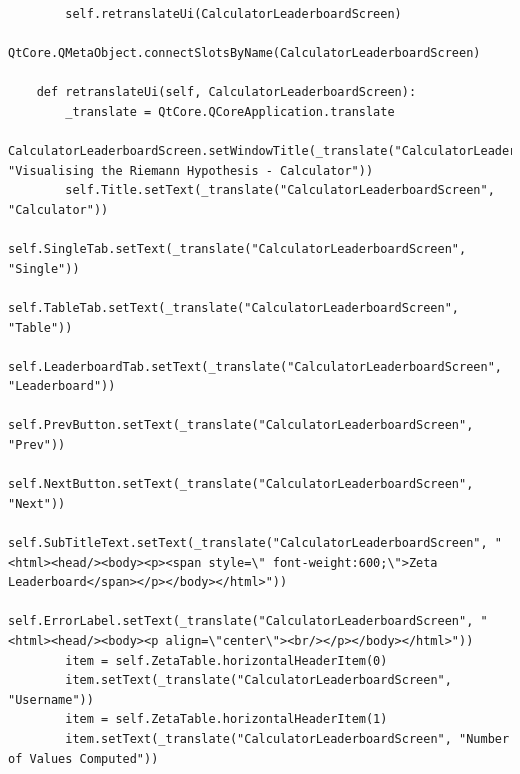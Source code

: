 \documentclass[12pt]{article}
\begin{document}
\begin{lstlisting}
        self.retranslateUi(CalculatorLeaderboardScreen)
        QtCore.QMetaObject.connectSlotsByName(CalculatorLeaderboardScreen)

    def retranslateUi(self, CalculatorLeaderboardScreen):
        _translate = QtCore.QCoreApplication.translate
        CalculatorLeaderboardScreen.setWindowTitle(_translate("CalculatorLeaderboardScreen", "Visualising the Riemann Hypothesis - Calculator"))
        self.Title.setText(_translate("CalculatorLeaderboardScreen", "Calculator"))
        self.SingleTab.setText(_translate("CalculatorLeaderboardScreen", "Single"))
        self.TableTab.setText(_translate("CalculatorLeaderboardScreen", "Table"))
        self.LeaderboardTab.setText(_translate("CalculatorLeaderboardScreen", "Leaderboard"))
        self.PrevButton.setText(_translate("CalculatorLeaderboardScreen", "Prev"))
        self.NextButton.setText(_translate("CalculatorLeaderboardScreen", "Next"))
        self.SubTitleText.setText(_translate("CalculatorLeaderboardScreen", "<html><head/><body><p><span style=\" font-weight:600;\">Zeta Leaderboard</span></p></body></html>"))
        self.ErrorLabel.setText(_translate("CalculatorLeaderboardScreen", "<html><head/><body><p align=\"center\"><br/></p></body></html>"))
        item = self.ZetaTable.horizontalHeaderItem(0)
        item.setText(_translate("CalculatorLeaderboardScreen", "Username"))
        item = self.ZetaTable.horizontalHeaderItem(1)
        item.setText(_translate("CalculatorLeaderboardScreen", "Number of Values Computed"))
\end{lstlisting}
\end{document}
